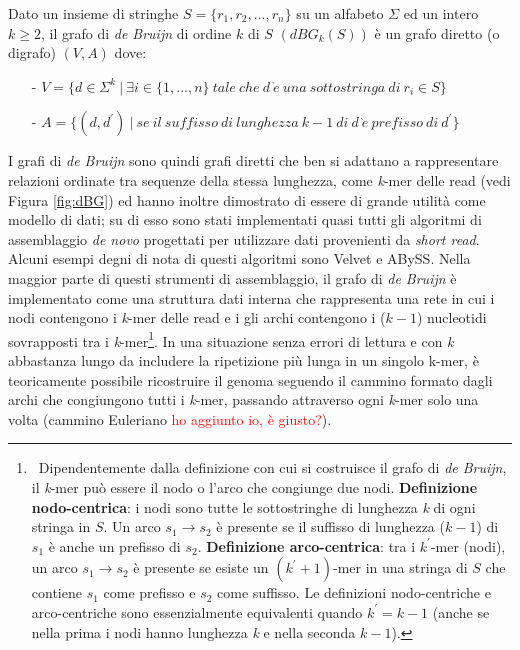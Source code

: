 \documentclass[../main.tex]{subfiles}
\begin{document}
\theoremstyle{definition}
\begin{definition} 
Dato un insieme di stringhe $S = \{r_1 , r_2 , ... , r_n\}$ su un alfabeto $\Sigma$ ed un intero $k\geq2$, il grafo di \textit{de Bruijn} di ordine $k$ di $S$ $(dBG_k (S))$ è un grafo diretto (o digrafo) $(V,A)$ dove:
\begin{itemize}
\item[-] $V = \{d \in \Sigma^k \ |\  \exists i \in \{1, ..., n\} \ tale\ che\ d\ \grave{e}\ una\ sottostringa\ di\ r_i \in S\}$
\item[-]$A = \{ (d,d^\prime)\ |\ se\ il\ suffisso\ di\ lunghezza\ k-1\ di\ d\ \grave{e}\ prefisso\ di\ d^\prime\}$
\end{itemize}
\end{definition}

\noindent
I grafi di \textit{de Bruijn} sono quindi grafi diretti che ben si adattano a rappresentare relazioni ordinate tra sequenze della stessa lunghezza, come \textit{k}-mer delle read (vedi Figura \ref{fig:dBG}) ed hanno inoltre dimostrato di essere di grande utilità come modello di dati; su di esso sono stati implementati quasi tutti gli algoritmi di assemblaggio \textit{de novo} progettati per utilizzare dati provenienti da \textit{short read}. Alcuni esempi degni di nota di questi algoritmi sono Velvet e ABySS. Nella maggior parte di questi strumenti di assemblaggio, il grafo di \textit{de Bruijn} è implementato come una struttura dati interna che rappresenta una rete in cui i nodi contengono i \textit{k}-mer delle read e i gli archi contengono i ($k-1$) nucleotidi sovrapposti tra i \textit{k}-mer\footnote{\ Dipendentemente dalla definizione con cui si costruisce il grafo di \textit{de Bruijn}, il \textit{k}-mer può essere il nodo o l'arco che congiunge due nodi. \textbf{Definizione nodo-centrica}: i nodi sono tutte le sottostringhe di lunghezza \textit{k} di ogni stringa in $S$. Un arco $s_1 \rightarrow s_2$ è presente se il suffisso di lunghezza ($k-1$) di $s_1$ è anche un prefisso di $s_2$. \textbf{Definizione arco-centrica}: tra i $k^\prime$-mer (nodi), un arco $s_1 \rightarrow s_2$ è presente se esiste un $(k^\prime+1)$-mer in una stringa di $S$ che contiene $s_1$ come prefisso e $s_2$ come suffisso. Le definizioni nodo-centriche e arco-centriche sono essenzialmente equivalenti quando $k^\prime = k-1$ (anche se nella prima i nodi hanno lunghezza \textit{k} e nella seconda $k - 1$).}. In una situazione senza errori di lettura e con \textit{k} abbastanza lungo da includere la ripetizione più lunga in un singolo k-mer, è teoricamente possibile ricostruire il genoma seguendo il cammino formato dagli archi che congiungono tutti i \textit{k}-mer, passando attraverso ogni \textit{k}-mer solo una volta (cammino Euleriano \textcolor{red}{ho aggiunto io, è giusto?}). 
\end{document}
